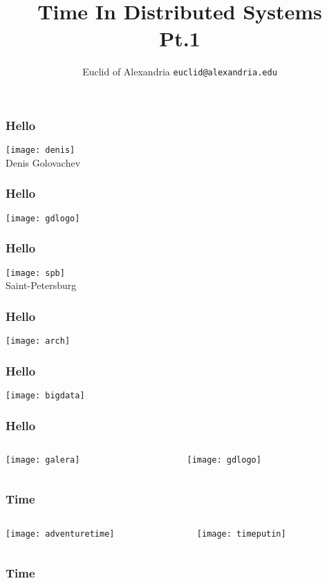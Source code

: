 \documentclass[aspectratio=169, 15pt]{beamer}
\title{Time In Distributed Systems\\Pt.1}
\author[Euclid]{Euclid of Alexandria \texttt{euclid@alexandria.edu}}
\begin{document}
{   
	\begin{titlePage} 
		\titlepage        
	\end{titlePage}
		
	\begin{gdblank}
		\frametitle{Hello}
		\centering\texttt{[image: denis]}
		\\Denis Golovachev
	\end{gdblank}
	\begin{gdblank}
		\frametitle{Hello}
		\centering\texttt{[image: gdlogo]}
	\end{gdblank}
	\begin{gdblank}
		\frametitle{Hello}
		\centering\texttt{[image: spb]}
		\\Saint-Petersburg
	\end{gdblank}
	\begin{gdblank}
		\frametitle{Hello}
		\centering\texttt{[image: arch]} 
	\end{gdblank}
	\begin{gdblank}
		\frametitle{Hello}
		\centering\texttt{[image: bigdata]} 
	\end{gdblank}
	\begin{gdblank}
		\frametitle{Hello}
		\begin{columns}
			\begin{column}{0.5\textwidth}
				\centering\texttt{[image: galera]}
			\end{column}
			\pause 
			\begin{column}{0.5\textwidth}
				\centering\texttt{[image: gdlogo]}
			\end{column}
		\end{columns}        
	\end{gdblank}
	\begin{gdblank}
		\frametitle{Time}
		\begin{columns}
			\begin{column}{0.5\textwidth}
				\centering\texttt{[image: adventuretime]} 
			\end{column}
			\pause 
			\begin{column}{0.5\textwidth}
				\centering\texttt{[image: timeputin]} 
			\end{column}
		\end{columns}            
	\end{gdblank}
	\begin{gdblank}
		\frametitle{Time}
		\begin{columns}

\end{columns}
\end{gdblank}}
\end{document}
